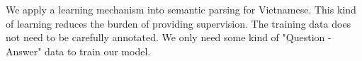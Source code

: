 We apply a learning mechanism into semantic parsing for Vietnamese. This kind of learning reduces the burden of providing supervision. The training data does not need to be carefully annotated. We only need some kind of "Question - Answer" data to train our model. 